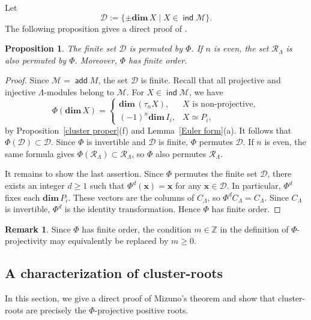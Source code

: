\documentclass[11pt,a4paper]{amsart}
\newtheorem{proposition}[theorem]{Proposition}
\theoremstyle{definition}
\newtheorem{remark}[theorem]{Remark}
\numberwithin{equation}{section}
\newcommand{\Z}{\mathbb{Z}}
\newcommand{\x}{\mathbf{x}}
\newcommand{\0}{\mathbf{0}}
\newcommand{\dimv}{\mathbf{dim}\,}
\DeclareMathOperator{\add}{\mathsf{add}}
\DeclareMathOperator{\ind}{\mathsf{ind}}
\begin{document}
		Let
	$$\mathcal{D}:=\{\pm\dimv X\mid X\in\ind \mathcal{M}  \}.$$		
	The following proposition gives a direct proof of 	\cite[Proposition~3.5]{Miz}. 	
	\begin{proposition} \label{finite order} The finite set $\mathcal{D}$		
		is permuted by $\Phi$. If $n$ is even, the set $\mathcal{R}_{\Lambda}$ is also permuted by $\Phi$. 
		Moreover, $\Phi$ has finite order.
	\end{proposition}
	\begin{proof}
			Since $\mathcal M=\add M$, the set $\mathcal D$ is finite.
			Recall that all projective and injective $\Lambda$-modules
			belong to $\mathcal M$.
			For $X\in\ind\mathcal M$, we have
			\[
			\Phi(\dimv X)=
			\begin{cases}
				\dimv(\tau_n X), & X \text{ is non-projective},\\
				(-1)^n\dimv I_i, & X\simeq P_i,
			\end{cases}
			\]
			by Proposition~\ref{cluster proper}(f) and
			Lemma~\ref{Euler form}(a).
				It follows that
			$\Phi(\mathcal{D})\subset\mathcal{D}$.
			Since $\Phi$ is invertible and $\mathcal{D}$ is finite,
			$\Phi$ permutes $\mathcal{D}$.			
			If $n$ is even, the same formula gives
			$\Phi(\mathcal R_\Lambda)\subset\mathcal R_\Lambda$,
			so $\Phi$ also permutes $\mathcal R_\Lambda$.
			
		It remains to show the last assertion. Since $\Phi$ permutes the finite set $\mathcal D$, 			
			 there exists an integer $d\ge 1$ such that
			$\Phi^d(\x)=\x$ for any
			$\x\in\mathcal{D}$.
			In particular, $\Phi^d$ fixes each $\dimv P_i$.
			These vectors are the columns of $C_\Lambda$, so
			$\Phi^d C_\Lambda=C_\Lambda.$ 
			Since $C_\Lambda$ is invertible, $\Phi^d$ is the identity transformation.
			Hence $\Phi$ has finite order.
		\end{proof}
		
		\begin{remark} 
				Since $\Phi$ has finite order, the condition $m\in\Z$
			in the definition of $\Phi$-projectivity may equivalently
			be replaced by $m\ge 0$.
		\end{remark}
	
	



	
	
	\subsection{A characterization of cluster-roots} In this section, we give a direct proof of Mizuno's theorem and show that cluster-roots are precisely the $\Phi$-projective  positive roots. 
	
\end{document}
